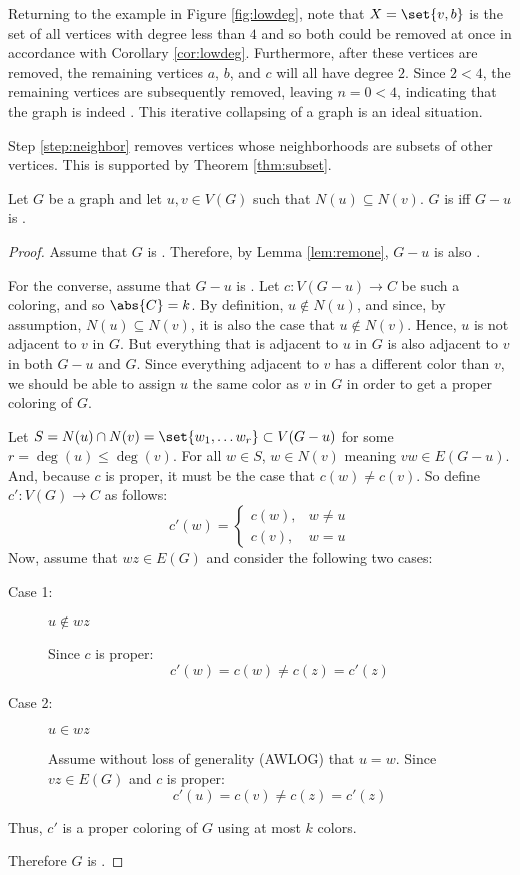Returning to the example in Figure \ref{fig:lowdeg}, note that \(X=\set{v,b}\) is the set of all vertices with
degree less than \(4\) and so both could be removed at once in accordance with Corollary \ref{cor:lowdeg}.
Furthermore, after these vertices are removed, the remaining vertices \(a\), \(b\), and \(c\) will all have degree
\(2\).  Since \(2<4\), the remaining vertices are subsequently removed, leaving \(n=0<4\), indicating that the
graph is indeed .  This iterative collapsing of a graph is an ideal situation.

Step \ref{step:neighbor} removes vertices whose neighborhoods are subsets of other vertices.  This is supported by
Theorem \ref{thm:subset}.

\begin{theorem}
  \label{thm:subset}
  Let \(G\) be a graph and let \(u,v\in V(G)\) such that \(N(u)\subseteq N(v)\).  \(G\) is  iff \(G-u\)
  is .
\end{theorem}

\begin{proof}
  Assume that \(G\) is .  Therefore, by Lemma \ref{lem:remone}, \(G-u\) is also .

  For the converse, assume that \(G-u\) is .  Let \(c:V(G-u)\to C\) be such a coloring, and so
  \(\abs{C}=k\).  By definition, \(u\notin N(u)\), and since, by assumption, \(N(u)\subseteq N(v)\), it is also the
  case that \(u\notin N(v)\).  Hence, \(u\) is not adjacent to \(v\) in \(G\).  But everything that is adjacent to
  \(u\) in \(G\) is also adjacent to \(v\) in both \(G-u\) and \(G\).  Since everything adjacent to \(v\) has a
  different color than \(v\), we should be able to assign \(u\) the same color as \(v\) in \(G\) in order to get a
  proper coloring of \(G\).

  Let \(S=N(u)\cap N(v)=\set{w_1,\ldots w_r}\subset V(G-u)\) for some \(r=\deg(u)\le \deg(v)\).  For all \(w\in
  S\), \(w\in N(v)\) meaning \(vw\in E(G-u)\).  And, because \(c\) is proper, it must be the case that \(c(w)\ne
  c(v)\).  So define \(c':V(G)\to C\) as follows:
  \[c'(w)=\begin{cases}
  c(w), & w\ne u \\
  c(v), & w=u
  \end{cases}\]
  Now, assume that \(wz\in E(G)\) and consider the following two cases:
  \begin{description}
  \item[Case 1:] \(u\notin wz\)

    Since \(c\) is proper:
    \[c'(w)=c(w)\ne c(z)=c'(z)\]
  \item[Case 2:] \(u\in wz\)

    Assume without loss of generality (AWLOG) that \(u=w\).  Since \(vz\in E(G)\) and \(c\) is proper:
    \[c'(u)=c(v)\ne c(z)=c'(z)\]
  \end{description}
  Thus, \(c'\) is a proper coloring of \(G\) using at most \(k\) colors.

  Therefore \(G\) is .
\end{proof}

